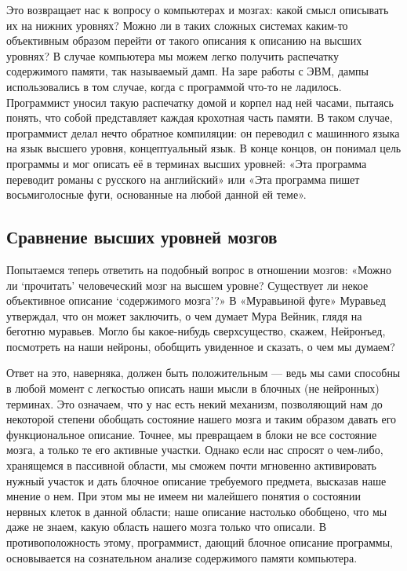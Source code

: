 \documentclass[../main.tex]{subfiles}
\begin{document}
Это возвращает нас к вопросу о компьютерах и мозгах: какой смысл описывать их на нижних уровнях? Можно ли в таких сложных системах каким-то объективным образом перейти от такого описания к описанию на высших уровнях? В случае компьютера мы можем легко получить распечатку содержимого памяти, так называемый дамп. На заре работы с ЭВМ, дампы использовались в том случае, когда с программой что-то не ладилось. Программист уносил такую распечатку домой и корпел над ней часами, пытаясь понять, что собой представляет каждая крохотная часть памяти. В таком случае, программист делал нечто обратное компиляции: он переводил с машинного языка на язык высшего уровня, концептуальный язык. В конце концов, он понимал цель программы и мог описать её в терминах высших уровней: «Эта программа переводит романы с русского на английский» или «Эта программа пишет восьмиголосные фуги, основанные на любой данной ей теме».


\subsection{Сравнение высших уровней мозгов}

Попытаемся теперь ответить на подобный вопрос в отношении мозгов: «Можно ли \enquote*{прочитать} человеческий мозг на высшем уровне? Существует ли некое объективное описание \enquote*{содержимого мозга}?» В «Муравьиной фуге» Муравьед утверждал, что он может заключить, о чем думает Мура Вейник, глядя на беготню муравьев. Могло бы какое-нибудь сверхсущество, скажем, Нейронъед, посмотреть на наши нейроны, обобщить увиденное и сказать, о чем мы думаем?

Ответ на это, наверняка, должен быть положительным --- ведь мы сами способны в любой момент с легкостью описать наши мысли в блочных (не нейронных) терминах. Это означаем, что у нас есть некий механизм, позволяющий нам до некоторой степени обобщать состояние нашего мозга и таким образом давать его функциональное описание. Точнее, мы превращаем в блоки не все состояние мозга, а только те его активные участки. Однако если нас спросят о чем-либо, хранящемся в пассивной области, мы сможем почти мгновенно активировать нужный участок и дать блочное описание требуемого предмета, высказав наше мнение о нем. При этом мы не имеем ни малейшего понятия о состоянии нервных клеток в данной области; наше описание настолько обобщено, что мы даже не знаем, какую область нашего мозга только что описали. В противоположность этому, программист, дающий блочное описание программы, основывается на сознательном анализе содержимого памяти компьютера.
\end{document}
